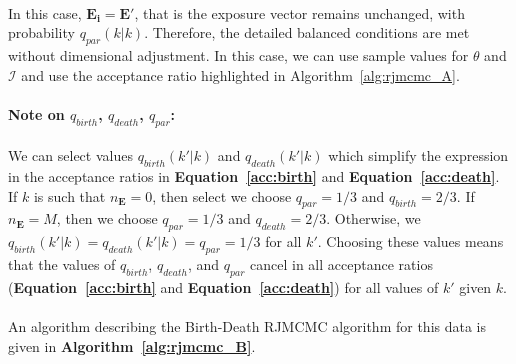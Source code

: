 \paragraph{}In this case, $\mathbf{E_i} = \mathbf{E'}$, that is the exposure vector remains unchanged, with probability $q_{par}(k|k)$. Therefore, the detailed balanced conditions are met without dimensional adjustment. In this case, we can use sample values for $\theta$ and $\mathcal{I}$ and use the acceptance ratio highlighted in Algorithm~\ref{alg:rjmcmc_A}.

\paragraph{Note on $q_{birth}$, $q_{death}$, $q_{par}$:} We can select values $q_{birth}(k' | k)$ and $q_{death}(k' | k)$ which simplify the expression in the acceptance ratios in \textbf{Equation~\ref{acc:birth}} and \textbf{Equation~\ref{acc:death}}. If $k$ is such that $n_{\mathbf{E}} = 0$, then select we choose $q_{par} = 1/3$ and $q_{birth} = 2/3$. If  $n_{\mathbf{E}} = M$, then we choose $q_{par} = 1/3$ and $q_{death} = 2/3$. Otherwise, we  $q_{birth}(k' | k) = q_{death}(k' | k) = q_{par} = 1/3$ for all $k'$. Choosing these values means that the values of $q_{birth}$, $q_{death}$, and $q_{par}$ cancel in all acceptance ratios (\textbf{Equation~\ref{acc:birth}} and \textbf{Equation~\ref{acc:death}}) for all values of $k'$ given $k$.

\paragraph{} An algorithm describing the Birth-Death RJMCMC algorithm for this data is given in \textbf{Algorithm~\ref{alg:rjmcmc_B}}.


